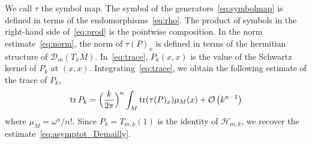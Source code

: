 \documentclass[10pt,a4paper]{article}
\theoremstyle{definition}
\numberwithin{equation}{section}
\newcommand{\om}{{\omega}}
\newcommand{\op}{\operatorname}
\newcommand{\bigo}{\mathcal{O}}
\newcommand{\D}{\mathcal{D}}
\newcommand{\Hilb}{\mathcal{H}}
\begin{document}
We call $\tau$ the symbol map. The symbol of the generators~\eqref{eq:symbolmap} is defined in terms of the endomorphisms~\eqref{eq:rho}. The product of symbols in the right-hand side of~\eqref{eq:prod} is the pointwise composition. In the norm estimate~\eqref{eq:norm}, the norm of $\tau (P)_x$ is defined in terms of the hermitian structure of $\D_m (T_xM)$. In~\eqref{eq:trace}, $P_k (x,x)$ is the value of the Schwartz kernel of $P_k$ at $(x,x)$. Integrating~\eqref{eq:trace}, we obtain the following estimate of the trace of $P_k$,
\begin{gather}
\op{tr} P_k = \Bigl(\frac{k}{2\pi} \Bigr)^n \int_M \op{tr} (\tau (P)_x) \mu_M(x) + \bigo \left(k^{n-1}\right)
\end{gather}
where $\mu_M = \om^n /n!$. Since $P_k =T_{m,k} (1)$ is the identity of $\Hilb_{m,k}$, we recover the estimate~\eqref{eq:asymptot_Demailly}.
\end{document}
